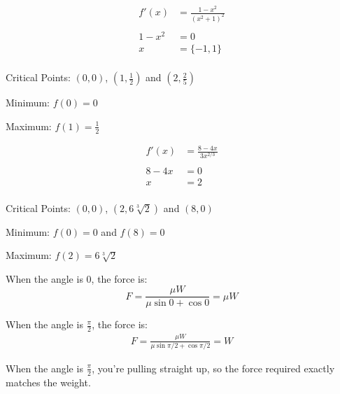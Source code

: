 \documentclass[letterpaper, landscape]{exam}
\begin{document}
\begin{description}
    \newpage

    \item[53] 
      \begin{align*}
        f'(x)   & = \frac{1 - x^2}{\left(x^2 + 1\right)^2} \\
        \\
        1 - x^2 & = 0 \\
        x       & = \{ -1, 1 \} \\
      \end{align*}

      \begin{itemize*}
        \item Critical Points: $(0, 0)$, $\left( 1, \frac{1}{2} \right)$ and 
          $\left( 2, \frac{2}{5} \right)$
        \item Minimum: $f(0) = 0$
        \item Maximum: $f(1) = \frac{1}{2}$ 
      \end{itemize*}

    \item[56] 
      \begin{align*}
        f'(x)  & = \frac{8 - 4x}{3 x^{2/3}} \\
        \\
        8 - 4x & = 0 \\
        x      & = 2 \\
      \end{align*}

      \begin{itemize*}
        \item Critical Points: $(0, 0)$, $( 2, 6 \sqrt[3]{2} )$ and $(8, 0)$
        \item Minimum: $f(0) = 0$ and $f(8) = 0$
        \item Maximum: $f(2) = 6 \sqrt[3]{2}$ 
      \end{itemize*}

    \item[70]
      When the angle is $0$, the force is:
      \[
        F = \frac{\mu W}{\mu \sin 0 + \cos 0} = \mu W 
        \]

      When the angle is $\frac{\pi}{2}$, the force is:
      \begin{align*}
        F = \frac{\mu W}{\mu \sin \pi/2 + \cos \pi/2} = W 
      \end{align*}

      When the angle is $\frac{\pi}{2}$, you're pulling straight up, so the force required exactly
      matches the weight.


\end{description}
\end{document}
